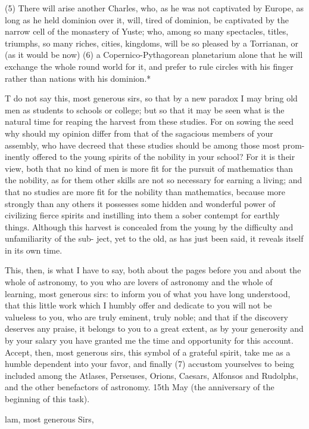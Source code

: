 \documentclass{article}
\begin{document}
{{{{{{{(5) There will arise another Charles, who, as he was not captivated by Europe,
as long as he held dominion over it, will, tired of dominion, be captivated by the
narrow cell of the monastery of Yuste; who, among so many spectacles, titles,
triumphs, so many riches, cities, kingdoms, will be so pleased by a Torrianan, or
(as it would be now) (6) a Copernico-Pythagorean planetarium alone that he will
exchange the whole round world for it, and prefer to rule circles with his finger
rather than nations with his dominion.*

T do not say this, most generous sirs, so that by a new paradox I may bring old
men as students to schools or college; but so that it may be seen what is the
natural time for reaping the harvest from these studies. For on sowing the seed
why should my opinion differ from that of the sagacious members of your
assembly, who have decreed that these studies should be among those most prom-
inently offered to the young spirits of the nobility in your school? For it is their
view, both that no kind of men is more fit for the pursuit of mathematics than the
nobility, as for them other skills are not so necessary for earning a living; and that
no studies are more fit for the nobility than mathematics, because more strongly
than any others it possesses some hidden and wonderful power of civilizing fierce
spirits and instilling into them a sober contempt for earthly things. Although this
harvest is concealed from the young by the difficulty and unfamiliarity of the sub-
ject, yet to the old, as has just been said, it reveals itself in its own time.

This, then, is what I have to say, both about the pages before you and about
the whole of astronomy, to you who are lovers of astronomy and the whole of
learning, most generous sirs: to inform you of what you have long understood,
that this little work which I humbly offer and dedicate to you will not be valueless
to you, who are truly eminent, truly noble; and that if the discovery deserves any
praise, it belongs to you to a great extent, as by your generosity and by your
salary you have granted me the time and opportunity for this account. Accept,
then, most generous sirs, this symbol of a grateful spirit, take me as a humble
dependent into your favor, and finally (7) accustom yourselves to being included
among the Atlases, Perseuses, Orions, Caesars, Alfonsos and Rudolphs, and the
other benefactors of astronomy.
15th May (the anniversary of the beginning of this task).

lam, most generous Sirs,

}}}}}}}
\end{document}
